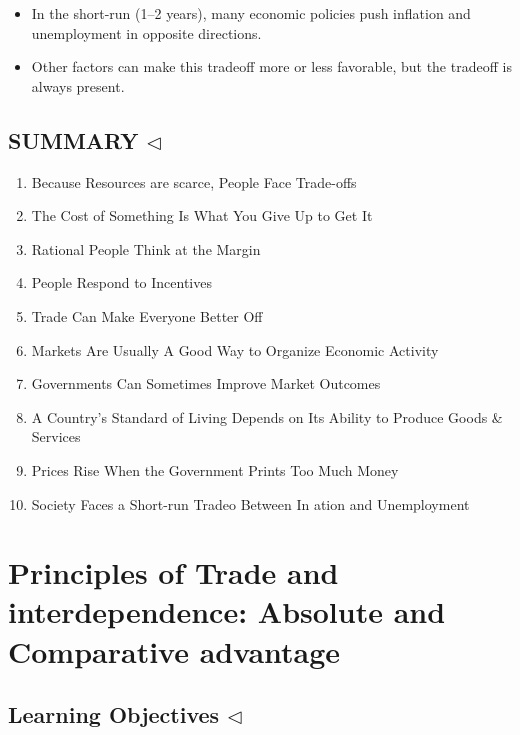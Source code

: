\documentclass[
]{book}
\providecommand{\tightlist}{%
  \setlength{\itemsep}{0pt}\setlength{\parskip}{0pt}}
\begin{document}
\begin{itemize}
\tightlist
\item
  In the short-run (1--2 years), many economic policies push inflation and unemployment in opposite directions.
\item
  Other factors can make this tradeoff more or less favorable, but the tradeoff is always present.
\end{itemize}

\hypertarget{summary-triangleleft}{%
\section{\texorpdfstring{SUMMARY \(\triangleleft\)}{SUMMARY \textbackslash triangleleft}}\label{summary-triangleleft}}

\begin{enumerate}
\def\labelenumi{\arabic{enumi}.}
\tightlist
\item
  Because Resources are scarce, People Face Trade-offs
\item
  The Cost of Something Is What You Give Up to Get It
\item
  Rational People Think at the Margin
\item
  People Respond to Incentives
\item
  Trade Can Make Everyone Better Off
\item
  Markets Are Usually A Good Way to Organize Economic Activity
\item
  Governments Can Sometimes Improve Market Outcomes
\item
  A Country's Standard of Living Depends on Its Ability to Produce Goods \& Services
\item
  Prices Rise When the Government Prints Too Much Money
\item
  Society Faces a Short-run Tradeo Between In ation and Unemployment
\end{enumerate}

\hypertarget{principles-of-trade-and-interdependence-absolute-and-comparative-advantage}{%
\chapter{Principles of Trade and interdependence: Absolute and Comparative advantage}\label{principles-of-trade-and-interdependence-absolute-and-comparative-advantage}}

\hypertarget{learning-objectives-triangleleft}{%
\section{\texorpdfstring{Learning Objectives \(\triangleleft\)}{Learning Objectives \textbackslash triangleleft}}\label{learning-objectives-triangleleft}}
\end{document}
